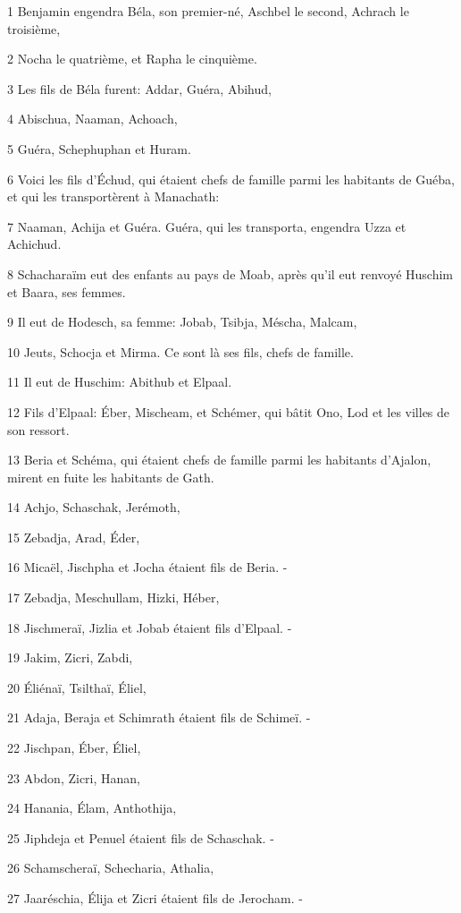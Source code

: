 \par 1 Benjamin engendra Béla, son premier-né, Aschbel le second, Achrach le troisième,
\par 2 Nocha le quatrième, et Rapha le cinquième.
\par 3 Les fils de Béla furent: Addar, Guéra, Abihud,
\par 4 Abischua, Naaman, Achoach,
\par 5 Guéra, Schephuphan et Huram.
\par 6 Voici les fils d'Échud, qui étaient chefs de famille parmi les habitants de Guéba, et qui les transportèrent à Manachath:
\par 7 Naaman, Achija et Guéra. Guéra, qui les transporta, engendra Uzza et Achichud.
\par 8 Schacharaïm eut des enfants au pays de Moab, après qu'il eut renvoyé Huschim et Baara, ses femmes.
\par 9 Il eut de Hodesch, sa femme: Jobab, Tsibja, Méscha, Malcam,
\par 10 Jeuts, Schocja et Mirma. Ce sont là ses fils, chefs de famille.
\par 11 Il eut de Huschim: Abithub et Elpaal.
\par 12 Fils d'Elpaal: Éber, Mischeam, et Schémer, qui bâtit Ono, Lod et les villes de son ressort.
\par 13 Beria et Schéma, qui étaient chefs de famille parmi les habitants d'Ajalon, mirent en fuite les habitants de Gath.
\par 14 Achjo, Schaschak, Jerémoth,
\par 15 Zebadja, Arad, Éder,
\par 16 Micaël, Jischpha et Jocha étaient fils de Beria. -
\par 17 Zebadja, Meschullam, Hizki, Héber,
\par 18 Jischmeraï, Jizlia et Jobab étaient fils d'Elpaal. -
\par 19 Jakim, Zicri, Zabdi,
\par 20 Éliénaï, Tsilthaï, Éliel,
\par 21 Adaja, Beraja et Schimrath étaient fils de Schimeï. -
\par 22 Jischpan, Éber, Éliel,
\par 23 Abdon, Zicri, Hanan,
\par 24 Hanania, Élam, Anthothija,
\par 25 Jiphdeja et Penuel étaient fils de Schaschak. -
\par 26 Schamscheraï, Schecharia, Athalia,
\par 27 Jaaréschia, Élija et Zicri étaient fils de Jerocham. -
